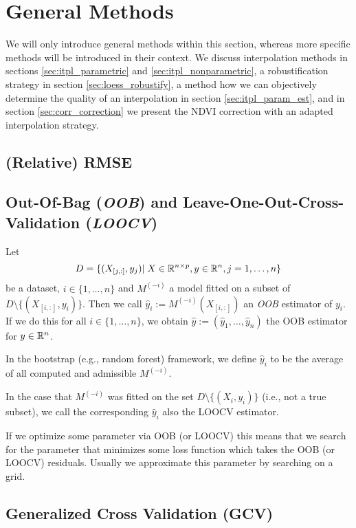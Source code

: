 \section{General Methods}{
	We will only introduce general methods within this section, whereas more specific methods will be introduced in their context. We discuss interpolation methods in sections \ref{sec:itpl_parametric} and \ref{sec:itpl_nonparametric}, a robustification strategy in section \ref{sec:loess_robustify}, a method how we can objectively determine the quality of an interpolation in section \ref{sec:itpl_param_est}, and in section \ref{sec:corr_correction} we present the NDVI correction with an adapted interpolation strategy.


	\subsection{(Relative) RMSE}

	\subsection{Out-Of-Bag (\textit{OOB}) and Leave-One-Out-Cross-Validation (\textit{LOOCV})}{
		\label{sec:OOB_LOOCV}
		Let 
		$$
			D=\{(X_{[j,:]},y_j)|\; X\in\mathbb{R}^{n\times p}, y\in \mathbb{R}^n, j=1,\dots,n\}
		$$
		be a dataset, $i\in \{1,\dots,n\}$ and $M^{(-i)}$ a model fitted on a subset of $D\setminus\{(X_{[i,:]},y_i)\}$. Then we call $\hat y_i:= M^{(-i)}(X_{[i,:]})$ an \textit{OOB} estimator of $y_i$. If we do this for all $i\in\{1,\dots,n\}$, we obtain $\hat y := \left(\hat y_1,\dots,\hat y_n\right)$ the OOB estimator for $y\in \mathbb{R}^n$.

		In the bootstrap (e.g., random forest) framework, we define $\hat y_i$ to be the average of all computed and admissible $M^{(-i)}$. 
		
		In the case that $M^{(-i)}$ was fitted on the set $D\setminus\{(X_i,y_i)\}$ (i.e., not a true subset), we call the corresponding $\hat y_i$ also the LOOCV estimator.	

		If we optimize some parameter via OOB (or LOOCV) this means that we search for the parameter that minimizes some loss function which takes the OOB (or LOOCV) residuals. Usually we approximate this parameter by searching on a grid. 
	}

	\subsection{Generalized Cross Validation (GCV)}{

	}
}
